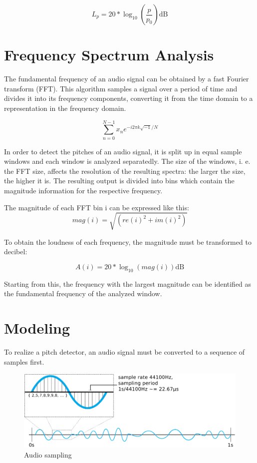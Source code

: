 \documentclass[runningheads,a4paper]{llncs}
\begin{document}
\begin{equation}
L_p = 20 * \log_{10}(\frac{p}{p_0}) \mathrm{dB}
\label{eq:spl}
\end{equation}

\section{Frequency Spectrum Analysis}
The fundamental frequency of an audio signal can be obtained by a fast Fourier transform (FFT). This algorithm samples a signal over a period of time and divides it into its frequency components, converting it from the time domain to a representation in the frequency domain.

\begin{equation}
\sum_{n=0}^{N-1}x_n  e^{-i 2 \pi k\sqrt{-1}/N}
\label{eq:fft}
\end{equation}

In order to detect the pitches of an audio signal, it is split up in equal sample windows and each window is analyzed separatedly. The size of the windows, i. e. the FFT size, affects the resolution of the resulting spectra: the larger the size, the higher it is.
The resulting output is divided into bins which contain the magnitude information for the respective frequency.

The magnitude of each FFT bin i can be expressed like this:
\begin{equation}
mag(i) = \sqrt{(re(i)^{2} + im(i)^{2})}
\label{eq:mag}
\end{equation}

To obtain the loudness of each frequency, the magnitude must be transformed to decibel:

\begin{equation}
A(i) = 20 * \log_{10}( mag(i) ) \mathrm{dB}
\label{eq:loc}
\end{equation}

Starting from this, the frequency with the largest magnitude can be identified as the fundamental frequency of the analyzed window.


\section{Modeling}
To realize a pitch detector, an audio signal must be converted to a sequence of samples first. 

 

\begin{figure}[]
  \centering
  \includegraphics[width=\textwidth]{img/menura_sampling.pdf}
  \caption{Audio sampling}
  \label{fig:sample2}
\end{figure}
\end{document}
